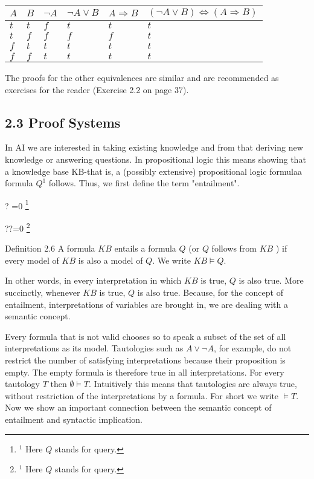 \documentclass[10pt]{article}
\let\svthefootnote\thefootnote
\newcommand\blfootnotetext[1]{%
  \let\thefootnote\relax\footnote{#1}%
  \addtocounter{footnote}{-1}%
  \let\thefootnote\svthefootnote%
}
\let\svfootnotetext\footnotetext
\renewcommand\footnotetext[2][?]{%
  \if\relax#1\relax%
    \ifnum\value{footnote}=0\blfootnotetext{#2}\else\svfootnotetext{#2}\fi%
  \else%
    \if?#1\ifnum\value{footnote}=0\blfootnotetext{#2}\else\svfootnotetext{#2}\fi%
    \else\svfootnotetext[#1]{#2}\fi%
  \fi
}
\begin{document}
\begin{center}
\begin{tabular}{llllll}
\hline
$A$ & $B$ & $\neg A$ & $\neg A \vee B$ & $A \Rightarrow B$ & $(\neg A \vee B) \Leftrightarrow(A \Rightarrow B)$ \\
\hline
$t$ & $t$ & $f$ & $t$ & $t$ & $t$ \\
\hline
$t$ & $f$ & $f$ & $f$ & $f$ & $t$ \\
\hline
$f$ & $t$ & $t$ & $t$ & $t$ & $t$ \\
\hline
$f$ & $f$ & $t$ & $t$ & $t$ & $t$ \\
\hline
\end{tabular}
\end{center}

The proofs for the other equivalences are similar and are recommended as exercises for the reader (Exercise 2.2 on page 37).

\subsection*{2.3 Proof Systems}
In AI we are interested in taking existing knowledge and from that deriving new knowledge or answering questions. In propositional logic this means showing that a knowledge base KB-that is, a (possibly extensive) propositional logic formulaa formula $Q^{1}$ follows. Thus, we first define the term "entailment".

Definition 2.6 A formula $K B$ entails a formula $Q$ (or $Q$ follows from $K B$ ) if every model of $K B$ is also a model of $Q$. We write $K B \models Q$.

In other words, in every interpretation in which $K B$ is true, $Q$ is also true. More succinctly, whenever $K B$ is true, $Q$ is also true. Because, for the concept of entailment, interpretations of variables are brought in, we are dealing with a semantic concept.

Every formula that is not valid chooses so to speak a subset of the set of all interpretations as its model. Tautologies such as $A \vee \neg A$, for example, do not restrict the number of satisfying interpretations because their proposition is empty. The empty formula is therefore true in all interpretations. For every tautology $T$ then $\emptyset \models T$. Intuitively this means that tautologies are always true, without restriction of the interpretations by a formula. For short we write $\models T$. Now we show an important connection between the semantic concept of entailment and syntactic implication.
\end{document}
